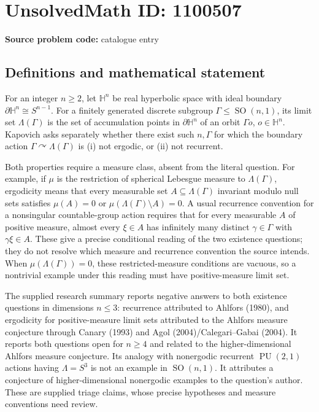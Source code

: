\documentclass[11pt]{article}
\begin{document}
\section*{UnsolvedMath ID: 1100507}
\textbf{Source problem code:} catalogue entry
\subsection{Definitions and mathematical statement}
For an integer \(n\ge2\), let \(\mathbb H^n\) be real hyperbolic space with ideal boundary \(\partial\mathbb H^n\cong S^{n-1}\). For a finitely generated discrete subgroup \(\Gamma\le\operatorname{SO}(n,1)\), its limit set \(\Lambda(\Gamma)\) is the set of accumulation points in \(\partial\mathbb H^n\) of an orbit \(\Gamma o\), \(o\in\mathbb H^n\). Kapovich asks separately whether there exist such \(n,\Gamma\) for which the boundary action \(\Gamma\curvearrowright\Lambda(\Gamma)\) is (i) not ergodic, or (ii) not recurrent.

Both properties require a measure class, absent from the literal question. For example, if \(\mu\) is the restriction of spherical Lebesgue measure to \(\Lambda(\Gamma)\), ergodicity means that every measurable set \(A\subseteq\Lambda(\Gamma)\) invariant modulo null sets satisfies \(\mu(A)=0\) or \(\mu(\Lambda(\Gamma)\setminus A)=0\). A usual recurrence convention for a nonsingular countable-group action requires that for every measurable \(A\) of positive measure, almost every \(\xi\in A\) has infinitely many distinct \(\gamma\in\Gamma\) with \(\gamma\xi\in A\). These give a precise conditional reading of the two existence questions; they do not resolve which measure and recurrence convention the source intends. When \(\mu(\Lambda(\Gamma))=0\), these restricted-measure conditions are vacuous, so a nontrivial example under this reading must have positive-measure limit set.

The supplied research summary reports negative answers to both existence questions in dimensions \(n\le3\): recurrence attributed to Ahlfors (1980), and ergodicity for positive-measure limit sets attributed to the Ahlfors measure conjecture through Canary (1993) and Agol (2004)/Calegari--Gabai (2004). It reports both questions open for \(n\ge4\) and related to the higher-dimensional Ahlfors measure conjecture. Its analogy with nonergodic recurrent \(\operatorname{PU}(2,1)\) actions having \(\Lambda=S^3\) is not an example in \(\operatorname{SO}(n,1)\). It attributes a conjecture of higher-dimensional nonergodic examples to the question's author. These are supplied triage claims, whose precise hypotheses and measure conventions need review.
\end{document}
